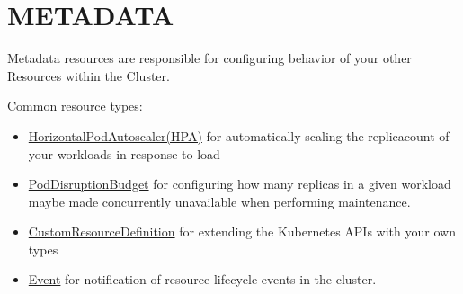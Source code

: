 \section{METADATA}

Metadata resources are responsible for configuring behavior of your other
Resources within the Cluster.

Common resource types:

\begin{itemize}
	\item \href{horizontalpodautoscaler-v1-autoscaling}{HorizontalPodAutoscaler(HPA)}
	    for automatically scaling the replicacount of your workloads in response to load
    \item \href{poddisruptionbudget-v1alpha1}{PodDisruptionBudget} for configuring
		how many replicas in a given workload maybe made concurrently unavailable when performing maintenance.
	\item \href{thirdpartyresource-v1beta1}{CustomResourceDefinition} for extending
		the Kubernetes APIs with your own types
	\item \href{event-v1-core}{Event} for notification of resource lifecycle events in the cluster.
\end{itemize}

